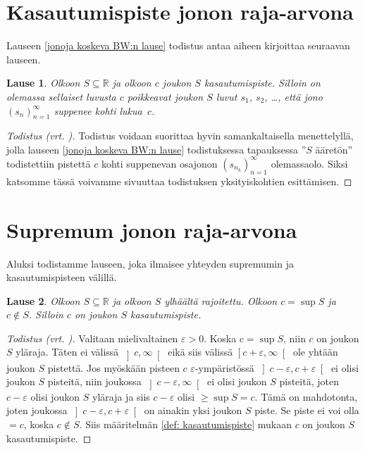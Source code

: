 \documentclass[a4paper,12pt,leqno,oneside]{report} %
\theoremstyle{plain}
\newtheorem{lause}{Lause}[chapter]
\theoremstyle{definition}
\theoremstyle{remark}
\numberwithin{equation}{chapter}
\newcommand*{\Rset}{\mathbb{R}}  %
\begin{document}
\section{Kasautumispiste jonon raja-arvona}%
\label{sec: Kasautumispiste jonon raja-arvona}

Lauseen \ref{jonoja koskeva BW:n lause} todistus antaa aiheen kirjoittaa seuraavan lauseen.

\begin{lause}
Olkoon $S\subseteq\Rset$ ja olkoon $c$ joukon $S$ kasautumispiste. Silloin on olemassa sellaiset luvusta $c$ poikkeavat joukon $S$ luvut $s_1$, $s_2$, \dots, että jono $(s_n)_{n=1}^\infty$ suppenee kohti lukua~$c$.
\end{lause}

\begin{proof}[Todistus \upshape(vrt. {\cite[s. 51]{Mathman}})]
Todistus voidaan suorittaa hyvin samankaltaisella menettelyllä, jolla lauseen \ref{jonoja koskeva BW:n lause} todistuksessa tapauksessa ''$S$ ääretön'' todistettiin pistettä $c$ kohti suppenevan osajonon $(s_{n_k})_{n=1}^\infty$ olemassaolo. Siksi katsomme tässä voivamme sivuuttaa todistuksen yksityiskohtien esittämisen. 
\end{proof}


\section{Supremum jonon raja-arvona}%
\label{sec: Supremum jonon raja-arvona}

Aluksi todistamme lauseen, joka ilmaisee yhteyden supremumin ja kasautumispisteen välillä.

\begin{lause}
Olkoon $S\subseteq\Rset$ ja olkoon $S$ ylhäältä rajoitettu. Olkoon $c = \sup S$ ja $c\notin S$. Silloin $c$ on joukon $S$ kasautumispiste. 
\end{lause}

\begin{proof}[Todistus \upshape(vrt. {\cite[s. 63]{Mathman}})]
Valitaan mielivaltainen $\varepsilon > 0$. Koska $c = \sup S$, niin $c$ on joukon $S$ yläraja. Täten ei välissä $\left]c,\infty\right[$ eikä siis välissä $\left[c+\varepsilon,\infty\right[$ ole yhtään joukon $S$ pistettä. Jos myöskään pisteen $c$ $\varepsilon$-ympäristössä $\left]c-\varepsilon,c+\varepsilon\right[$ ei olisi joukon $S$ pisteitä, niin joukossa $\left]c-\varepsilon,\infty\right[$ ei olisi joukon $S$ pisteitä, joten $c-\varepsilon$ olisi joukon $S$ yläraja ja siis $c-\varepsilon$ olisi $\ge\sup S = c$. Tämä on mahdotonta, joten joukossa $\left]c-\varepsilon,c+\varepsilon\right[$ on ainakin yksi joukon $S$ piste. Se piste ei voi olla $= c$, koska $c\notin S$. Siis määritelmän \ref{def: kasautumispiste} mukaan $c$ on joukon $S$ kasautumispiste.
\end{proof}
\end{document}
